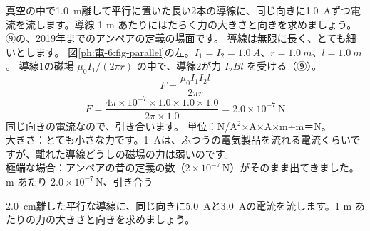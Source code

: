 \label{ph:電-6:ex6}
\begin{phreidai}[平行電流の力とアンペアの定義]
真空の中で\qty{1.0}{m}離して平行に置いた長い2本の導線に、同じ向きに\qty{1.0}{A}ずつ電流を流します。導線 1 m あたりにはたらく力の大きさと向きを求めましょう。
\phbamen
⑨の、2019年までのアンペアの定義の場面です。
\phmushi
導線は無限に長く、とても細いとします。
\phzu
図\ref{ph:電-6:fig-parallel}の左。$I_1=I_2=\qty{1.0}{A}$、$r=\qty{1.0}{m}$、$l=\qty{1.0}{m}$。
\phriyu
導線1の磁場 $\mu_0I_1/(2\pi r)$ の中で、導線2が力 $I_2Bl$ を受ける（⑨）。
\phtateru
\[F=\frac{\mu_0I_1I_2l}{2\pi r}\]
\phtoku
\[F=\frac{4\pi\times10^{-7}\times1.0\times1.0\times1.0}{2\pi\times1.0}=2.0\times10^{-7}\ \text{N}\]
同じ向きの電流なので、引き合います。
\phtashikame
単位：N/A$^2$×A×A×m÷m＝N。\\
大きさ：とても小さな力です。\qty{1}{A}は、ふつうの電気製品を流れる電流くらいですが、離れた導線どうしの磁場の力は弱いのです。\\
極端な場合：アンペアの昔の定義の数（$2\times10^{-7}$\,N）がそのまま出てきました。
 m あたり $2.0\times10^{-7}$\,N、引き合う
\end{phreidai}
\begin{jibun}
\qty{2.0}{cm}離した平行な導線に、同じ向きに\qty{5.0}{A}と\qty{3.0}{A}の電流を流します。1 m あたりの力の大きさと向きを求めましょう。
\end{jibun}

